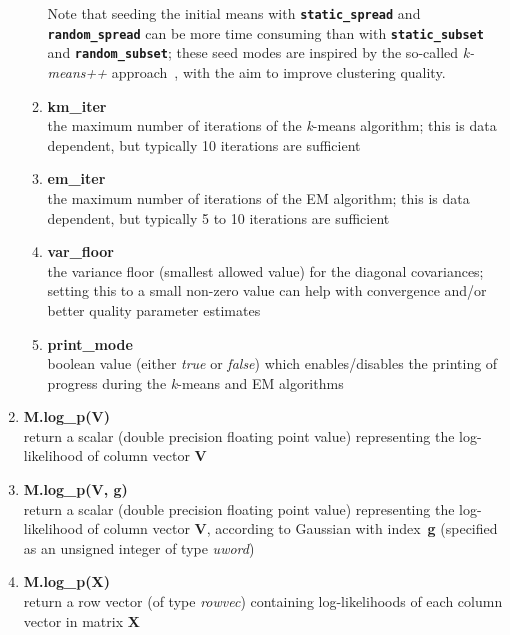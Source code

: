 \begin{enumerate}[{$\bullet$}]
\begin{small}
\begin{enumerate}[{-}]
\vspace{-1.5ex}
Note that seeding the initial means with {\tt\bfseries static\_spread} and {\tt\bfseries random\_spread}
can be more time consuming than with {\tt\bfseries static\_subset} and {\tt\bfseries random\_subset};
these seed modes are inspired by the so-called {\it k-means++} approach~\cite{Arthur_2007}, with the aim to improve clustering quality.
\vspace{1ex}

\item
{\bf km\_iter}\\
the maximum number of iterations of the {\it k}-means algorithm; this is data dependent, but typically 10 iterations are sufficient

\item
{\bf em\_iter}\\
the maximum number of iterations of the EM algorithm; this is data dependent, but typically 5 to 10 iterations are sufficient

\item
{\bf var\_floor}\\
the variance floor (smallest allowed value) for the diagonal covariances; setting this to a small non-zero value can help with convergence and/or better quality parameter estimates

\item
{\bf print\_mode}\\
boolean value (either {\it true} or {\it false}) which enables/disables the printing of progress during the {\it k}-means and EM algorithms 

\end{enumerate}
\end{small}

\item
{\bf M.log\_p(V)}\\
return a scalar (double precision floating point value) representing the log-likelihood of column vector {\bf V}

\item
{\bf M.log\_p(V, g)}\\
return a scalar (double precision floating point value) representing the log-likelihood of column vector {\bf V},
according to Gaussian with index~{\bf g} (specified as an unsigned integer of type {\it uword})

\item
{\bf M.log\_p(X)}\\
return a row vector (of type {\it rowvec}) containing log-likelihoods of each column vector in matrix {\bf X}



\end{enumerate}
